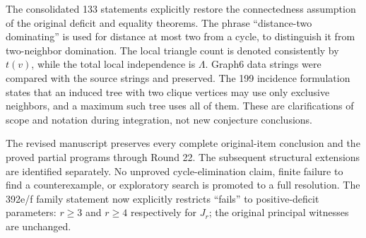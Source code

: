 \documentclass[11pt,a4paper]{article}
\theoremstyle{definition}\newtheorem{definition}[theorem]{Definition}
\theoremstyle{remark}\newtheorem{remark}[theorem]{Remark}
\begin{document}
The consolidated 133 statements explicitly restore the connectedness
assumption of the original deficit and equality theorems. The phrase
``distance-two dominating'' is used for distance at most two from a
cycle, to distinguish it from two-neighbor domination. The local triangle
count is denoted consistently by $t(v)$, while the total local
independence is $\Lambda$. Graph6 data strings were compared with the
source strings and preserved. The 199 incidence formulation states
that an induced tree with two clique vertices may use only exclusive
neighbors, and a maximum such tree uses all of them. These are
clarifications of scope and notation during integration, not new
conjecture conclusions.

The revised manuscript preserves every complete original-item conclusion
and the proved partial programs through Round 22. The subsequent structural
extensions are identified separately. No unproved cycle-elimination claim,
finite failure to find a counterexample, or exploratory search is promoted
to a full resolution. The 392e/f family statement now explicitly restricts
``fails'' to positive-deficit parameters: $r\ge3$ and $r\ge4$ respectively
for $J_r$; the original principal witnesses are unchanged.
\end{document}
